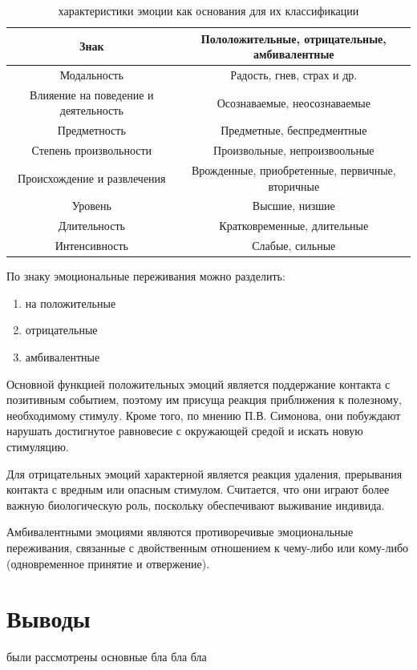 \begin{table}[H]
\caption{характеристики эмоции как основания для их классификации}
\label{tbl:text_a00}
\begin{center}
\begin{tabular}{ | c | c | }
	\hline
	Знак & Пололожительные, отрицательные, амбивалентные \\ \hline 
	Модальность & Радость, гнев, страх и др. \\ \hline
	Влияение на поведение и деятельность & Осознаваемые, неосознаваемые \\ \hline
	Предметность	& Предметные, беспредментные \\ \hline
	Степень произвольности & Произвольные, непроизвоольные \\ \hline
	Происхождение и развлечения & Врожденные, приобретенные, первичные, вторичные \\ \hline
	Уровень & Высшие, низшие \\ \hline
	Длительность & Кратковременные, длительные \\ \hline
	Интенсивность & Слабые, сильные \\ \hline
\end{tabular}
\end{center}
\end{table}

По знаку эмоциональные переживания можно разделить:
\begin{enumerate}
	\item на положительные
	\item отрицательные
	\item амбивалентные
\end{enumerate}

Основной функцией положительных эмоций является поддержание контакта с позитивным событием, поэтому им присуща реакция приближения к полезному, необходимому стимулу. Кроме того, по мнению П.В. Симонова, они побуждают нарушать достигнутое равновесие с окружающей средой и искать новую стимуляцию.

Для отрицательных эмоций характерной является реакция удаления, прерывания контакта с вредным или опасным стимулом. Считается, что они играют более важную биологическую роль, поскольку обеспечивают выживание индивида.

Амбивалентными эмоциями являются противоречивые эмоциональные переживания, связанные с двойственным отношением к чему-либо или кому-либо (одновременное принятие и отвержение).

\section{Выводы}

были рассмотрены основные бла бла бла 

